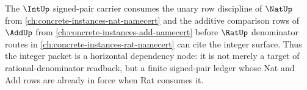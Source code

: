 \begin{proposition}
\label{prop:int-nat-add-rat-sibling-dependency-lattice}
The $\IntUp$ signed-pair carrier consumes the unary row discipline of $\NatUp$ from \autoref{ch:concrete-instances-nat-namecert} and the additive comparison rows of $\AddUp$ from \autoref{ch:concrete-instances-add-namecert} before $\RatUp$ denominator routes in \autoref{ch:concrete-instances-rat-namecert} can cite the integer surface. Thus the integer packet is a horizontal dependency node: it is not merely a target of rational-denominator readback, but a finite signed-pair ledger whose Nat and Add rows are already in force when Rat consumes it.
\end{proposition}
